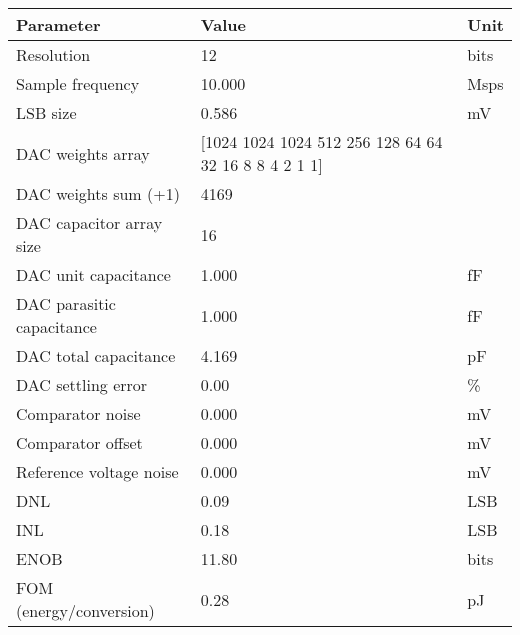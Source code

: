 \begin{tabular}{lll}
\toprule
Parameter & Value & Unit \\
\midrule
Resolution & 12 & bits \\
Sample frequency & 10.000 & Msps \\
LSB size & 0.586 & mV \\
DAC weights array & [1024 1024 1024  512  256  128   64   64   32   16    8    8    4    2
    1    1] &  \\
DAC weights sum (+1) & 4169 &  \\
DAC capacitor array size & 16 &  \\
DAC unit capacitance & 1.000 & fF \\
DAC parasitic capacitance & 1.000 & fF \\
DAC total capacitance & 4.169 & pF \\
DAC settling error & 0.00 & \% \\
Comparator noise & 0.000 & mV \\
Comparator offset & 0.000 & mV \\
Reference voltage noise & 0.000 & mV \\
DNL & 0.09 & LSB \\
INL & 0.18 & LSB \\
ENOB & 11.80 & bits \\
FOM (energy/conversion) & 0.28 & pJ \\
\bottomrule
\end{tabular}
